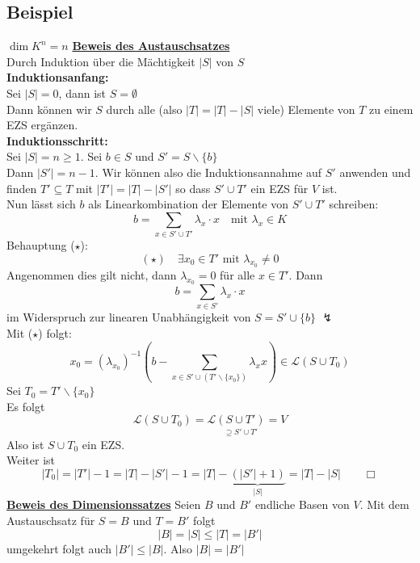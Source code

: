 
\subsection{Beispiel} %
\label{sub:beispiel}
$\dim K^n = n$
\newpage
{\large \underline{\textbf{Beweis des Austauschsatzes}}}
\vspace{\baselineskip} \\
Durch Induktion über die Mächtigkeit $|S|$ von $S$
\vspace{\baselineskip} \\
\textbf{Induktionsanfang:} \\
Sei $|S|=0$, dann ist $S = \emptyset$ \\
Dann können wir $S$ durch alle (also $|T|= |T| -|S|$ viele) Elemente von $T$ zu einem EZS ergänzen.
\vspace{\baselineskip} \\
\textbf{Induktionsschritt:} \\
Sei $|S| = n \geq 1$. Sei $b \in S$ und $S' = S \backslash \{b\}$ \\
Dann $|S'| = n-1$. Wir können also die Induktionsannahme auf $S'$ anwenden und finden $T' \subseteq T$ mit $|T'| = |T| - |S'|$
so dass $S' \cup T'$ ein EZS für $V$ ist.
\vspace{\baselineskip} \\
Nun lässt sich $b$ als Linearkombination der Elemente von $S' \cup T'$ schreiben:
\[
	b= \sum_{x \in S' \cup T'} \lambda_x \cdot x \quad \text{mit } \lambda_x \in K
\]
Behauptung ($\star$):
\[
	(\star) \quad \exists x_0 \in T' \text{ mit } \lambda_{x_0} \not= 0
\]
Angenommen dies gilt nicht, dann $\lambda_{x_0} = 0$ für alle $x \in T'$. Dann
\[
	b = \sum_{x \in S'} \lambda_x \cdot x
\]
im Widerspruch zur linearen Unabhängigkeit von $S= S' \cup \{ b\}$ {\huge $\lightning$}
\vspace{\baselineskip} \\
Mit ($\star$) folgt:
\[
	x_0 = (\lambda_{x_0})^{-1} \left( b - \sum_{x \in S' \cup (T' \backslash \{ x_0 \})} \lambda_{x} x \right) \in \mathcal{L} (S \cup T_0)
\]
Sei $T_0 = T' \backslash \{ x_0\}$ \\
Es folgt
\[
	\mathcal{L} (S \cup T_0) = \mathcal{L} \underset{\supseteq S' \cup T'}{(S \cup T')} = V
\]
Also ist $S \cup T_0$ ein EZS.
\vspace{\baselineskip} \\
Weiter ist 
\[
	|T_0| = |T'| -1 = |T| - |S'| -1 = |T| - \underbrace{(|S'| +1)}_{ |S|} = |T| - |S| \qquad \Box
\]
\newpage
{\large \underline{\textbf{Beweis des Dimensionssatzes}}}
Seien $B$ und $B'$ endliche Basen von $V$. Mit dem Austauschsatz für $S=B$ und $T=B'$ folgt
\[
	|B| = |S| \leq |T| = |B'|
\]
umgekehrt folgt auch $|B'| \leq |B|$. Also $|B| = |B'|$

